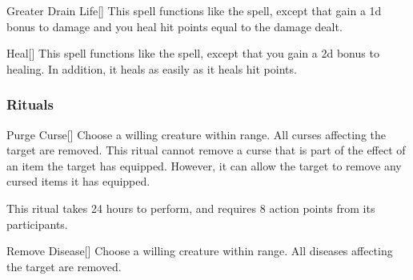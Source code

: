 \lowercase{\hypertarget{spell:Greater Drain Life}{}}\label{spell:Greater Drain Life}
\begin{apability}[\nth{5}]{\hypertarget{spell:Greater Drain Life}{Greater Drain Life}}[]
This spell functions like the  spell, except that gain a \plus1d bonus to damage and you heal hit points equal to the damage dealt.
\end{apability}
\vspace{0.25em}



\lowercase{\hypertarget{spell:Heal}{}}\label{spell:Heal}
\begin{apability}[\nth{5}]{\hypertarget{spell:Heal}{Heal}}[]
This spell functions like the  spell, except that you gain a \plus2d bonus to healing.
In addition, it heals  as easily as it heals hit points.
\end{apability}
\vspace{0.25em}



\subsubsection{Rituals}


\lowercase{\hypertarget{spell:Purge Curse}{}}\label{spell:Purge Curse}
\begin{apability}[\nth{2}]{\hypertarget{spell:Purge Curse}{Purge Curse}}[]
Choose a willing creature within \rngclose range.
All curses affecting the target are removed.
This ritual cannot remove a curse that is part of the effect of an item the target has equipped.
However, it can allow the target to remove any cursed items it has equipped.

This ritual takes 24 hours to perform, and requires 8 action points from its participants.
\end{apability}
\vspace{0.25em}



\lowercase{\hypertarget{spell:Remove Disease}{}}\label{spell:Remove Disease}
\begin{apability}[\nth{2}]{\hypertarget{spell:Remove Disease}{Remove Disease}}[]
Choose a willing creature within \rngmed range.
All diseases affecting the target are removed.
\end{apability}
\vspace{0.25em}



